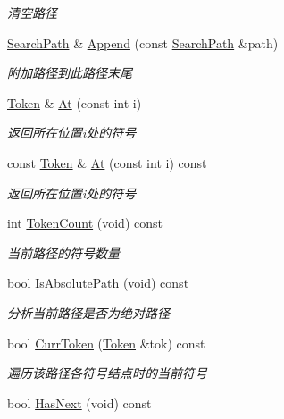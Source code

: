 \begin{DoxyCompactItemize}
\begin{DoxyCompactList}\small\item\em 清空路径 \end{DoxyCompactList}\item 
\hyperlink{class_lexer_sys_1_1_search_path}{Search\-Path} \& \hyperlink{class_lexer_sys_1_1_search_path_acfce5c8a697fbc69b09d3dcb29a00db1}{Append} (const \hyperlink{class_lexer_sys_1_1_search_path}{Search\-Path} \&path)
\begin{DoxyCompactList}\small\item\em 附加路径到此路径末尾 \end{DoxyCompactList}\item 
\hyperlink{class_lexer_sys_1_1_token}{Token} \& \hyperlink{class_lexer_sys_1_1_search_path_a47aaaf5b54a56d66516c6d4ad48ee9ae}{At} (const int i)
\begin{DoxyCompactList}\small\item\em 返回所在位置i处的符号 \end{DoxyCompactList}\item 
const \hyperlink{class_lexer_sys_1_1_token}{Token} \& \hyperlink{class_lexer_sys_1_1_search_path_a7dbfa28d64f9f2c83526d3e99d38a1cb}{At} (const int i) const 
\begin{DoxyCompactList}\small\item\em 返回所在位置i处的符号 \end{DoxyCompactList}\item 
int \hyperlink{class_lexer_sys_1_1_search_path_ae5331a0f6dc2934e37c4fc4684a70c09}{Token\-Count} (void) const 
\begin{DoxyCompactList}\small\item\em 当前路径的符号数量 \end{DoxyCompactList}\item 
bool \hyperlink{class_lexer_sys_1_1_search_path_a68b4a32eade0158303e8570811c6af2d}{Is\-Absolute\-Path} (void) const 
\begin{DoxyCompactList}\small\item\em 分析当前路径是否为绝对路径 \end{DoxyCompactList}\item 
bool \hyperlink{class_lexer_sys_1_1_search_path_a83f7615804a9fac015e0434ab183d09e}{Curr\-Token} (\hyperlink{class_lexer_sys_1_1_token}{Token} \&tok) const 
\begin{DoxyCompactList}\small\item\em 遍历该路径各符号结点时的当前符号 \end{DoxyCompactList}\item 
\hypertarget{class_lexer_sys_1_1_search_path_a489e6a5e1491504d3c30d0521694ac68}{bool \hyperlink{class_lexer_sys_1_1_search_path_a489e6a5e1491504d3c30d0521694ac68}{Has\-Next} (void) const }\label{class_lexer_sys_1_1_search_path_a489e6a5e1491504d3c30d0521694ac68}


\end{DoxyCompactItemize}
